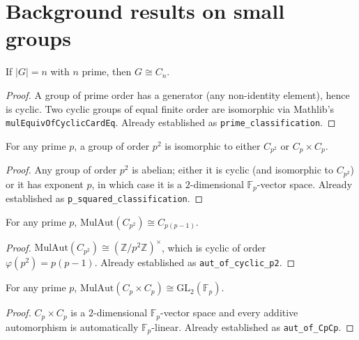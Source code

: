 \section{Background results on small groups}

\begin{lemma}
    \label{lem:prime-classification}
    If $|G| = n$ with $n$ prime, then $G \cong C_n$.
\end{lemma}
\begin{proof}
    A group of prime order has a generator (any non-identity element), hence
    is cyclic. Two cyclic groups of equal finite order are isomorphic via
    Mathlib's \texttt{mulEquivOfCyclicCardEq}. Already established as
    \texttt{prime\_classification}.
\end{proof}

\begin{lemma}
    \label{lem:p-squared-classification}
    For any prime $p$, a group of order $p^2$ is isomorphic to either
    $C_{p^2}$ or $C_p \times C_p$.
\end{lemma}
\begin{proof}
    Any group of order $p^2$ is abelian; either it is cyclic (and isomorphic
    to $C_{p^2}$) or it has exponent $p$, in which case it is a $2$-dimensional
    $\mathbb{F}_p$-vector space. Already established as
    \texttt{p\_squared\_classification}.
\end{proof}

\begin{lemma}
    \label{lem:aut-cyclic-p2}
    For any prime $p$, $\mathrm{MulAut}(C_{p^2}) \cong C_{p(p-1)}$.
\end{lemma}
\begin{proof}
    $\mathrm{MulAut}(C_{p^2}) \cong (\mathbb{Z}/p^2 \mathbb{Z})^\times$,
    which is cyclic of order $\varphi(p^2) = p(p-1)$. Already established as
    \texttt{aut\_of\_cyclic\_p2}.
\end{proof}

\begin{lemma}
    \label{lem:aut-CpCp}
    For any prime $p$, $\mathrm{MulAut}(C_p \times C_p) \cong
    \mathrm{GL}_2(\mathbb{F}_p)$.
\end{lemma}
\begin{proof}
    $C_p \times C_p$ is a $2$-dimensional $\mathbb{F}_p$-vector space and
    every additive automorphism is automatically $\mathbb{F}_p$-linear.
    Already established as \texttt{aut\_of\_CpCp}.
\end{proof}

